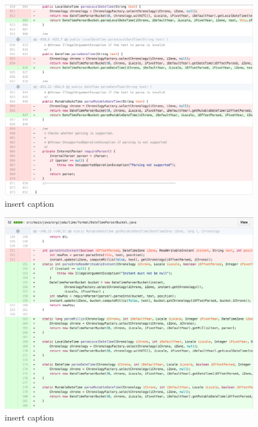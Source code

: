 \begin{figure}[H]
	\centering
	\includegraphics[width=\linewidth]{code60}
	\caption{insert caption}
\end{figure}
\begin{figure}[H]
	\centering
	\includegraphics[width=\linewidth]{code61}
	\caption{insert caption}
\end{figure}
